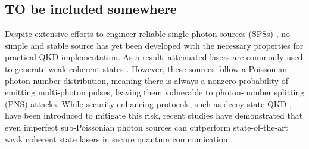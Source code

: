 \subsection{TO be included somewhere}


Despite extensive efforts to engineer reliable single-photon sources (SPSs) \cite{Eisaman2011}, no simple and stable source has yet been developed with the necessary properties for practical QKD implementation. As a result, attenuated lasers are commonly used to generate weak coherent states \cite{Stucki2005}. However, these sources follow a Poissonian photon number distribution, meaning there is always a nonzero probability of emitting multi-photon pulses, leaving them vulnerable to photon-number splitting (PNS) attacks. While security-enhancing protocols, such as decoy state QKD \cite{Lo2005}, have been introduced to mitigate this risk, recent studies have demonstrated that even imperfect sub-Poissonian photon sources can outperform state-of-the-art weak coherent state lasers in secure quantum communication \cite{Ordan2024}.

